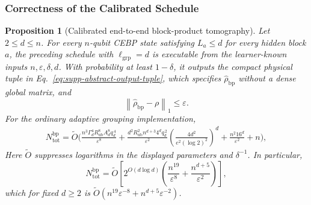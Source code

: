 \documentclass[
  aps,
  prx,
  reprint,
  superscriptaddress,
  amsmath,
  amssymb,
  nofootinbib,
  longbibliography
]{revtex4-2}
\newtheorem{proposition}[theorem]{Proposition}
\begin{document}
\subsubsection{Correctness of the Calibrated Schedule}
\label{sec:supp-calibrated-correctness}

\begin{proposition}[Calibrated end-to-end block-product tomography]
\label{prop:supp-calibrated-block-product-tomography}
Let $2\le d\le n$.  For every \(n\)-qubit CEBP state satisfying
$L_a\le d$ for every hidden block $a$,
the preceding schedule with \(\ell_{\mathrm{grp}}=d\) is executable from
the learner-known inputs \(n,\varepsilon,\delta,d\).  With probability at
least \(1-\delta\), it outputs the compact physical tuple in
Eq.~\eqref{eq:supp-abstract-output-tuple}, which specifies
\(\widehat\rho_{\mathrm{bp}}\) without a dense global matrix, and
\begin{equation}
\left\|\widehat\rho_{\mathrm{bp}}-\rho\right\|_1
\le\varepsilon.
\label{eq:supp-calibrated-block-product-accuracy}
\end{equation}
For the ordinary adaptive grouping implementation,
\begin{align}
N_{\mathrm{tot}}^{\mathrm{bp}}
=\widetilde O\!\Bigg(
\frac{
n^3\Gamma_d^4R_{\mathrm{ub}}^8A_d^8
q_d^{\,4}
}{\varepsilon^8}
+
\frac{
d^2R_{\mathrm{ub}}^2n^{d+3}4^d
q_d^{\,2}
}{\varepsilon^2}
\left(
\frac{4d^2}{e^2(\log 2)^2}
\right)^d
+
\frac{n^2 16^d}{\varepsilon^2}
+n
\Bigg),
\label{eq:supp-calibrated-block-product-copy-count}
\end{align}
Here \(\widetilde O\) suppresses logarithms in the displayed parameters and
\(\delta^{-1}\).  In particular,
\begin{equation}
N_{\mathrm{tot}}^{\mathrm{bp}}
=
\widetilde O\!\left[
2^{O(d\log d)}
\left(
\frac{n^{19}}{\varepsilon^8}
+
\frac{n^{d+5}}{\varepsilon^2}
\right)
\right],
\label{eq:supp-calibrated-block-product-copy-count-simplified}
\end{equation}
which for fixed $d\ge2$ is
$\widetilde O(n^{19}\varepsilon^{-8}+n^{d+5}\varepsilon^{-2})$.
\end{proposition}
\end{document}
